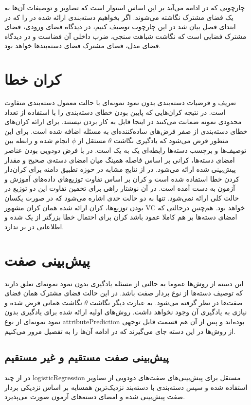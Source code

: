  چارچوبی که در ادامه می‌آید بر این اساس استوار است که تصاویر و توصیفات آن‌ها به یک فضای مشترک نگاشته می‌شوند. اگر بخواهیم دسته‌بندی ارائه شده در \cite{bengio08} را که در ابتدای فصل بیان شد در  این چارچوب توصیف کنیم، در دیدگاه فضای ورودی، فضای مشترک فضایی است که نگاشت شباهت سنجی، ضرب داخلی آن فضاست و در دیدگاه فضای مدل، فضای مشترک فضای دسته‌بندها خواهد بود.


\section{کران خطا}\label{bound}
تعریف و فرضیات دسته‌بندی بدون نمود نمونه‌ای با حالت معمول دسته‌بندی متفاوت است. در نتیجه کران‌هایی که پایین بودن خطای دسته‌بندی را با استفاده از تعداد محدودی نمونه ضمانت می‌کنند در اینجا قابل به کار بردن نیستند. برای ارائه کران‌های خطای دسته‌بندی از صفر فرض‌های ساده‌کننده‌ای به مسئله اضافه شده است. برای این منظور فرض می‌شود که یادگیری نگاشت 
$\theta$
 مستقل از $\phi$ انجام شده و رابطه بین توصیف‌ها و برچسب دسته‌ها رابطه‌ای یک به یک است. 
در \cite{hinton09} با فرض دودویی بودن عناصر امضای دسته‌ها، کرانی  بر اساس فاصله همینگ 
میان امضای دسته‌ی صحیح و مقدار پیش‌بینی شده ارائه می‌شود. در \cite{emb15} از نتایج مشابه در حوزه تطبیق دامنه برای کران‌دار کردن خطا استفاده شده است و کران بر اساس تفاوت توزیع‌های داده‌های آموزش و آزمون به دست آمده است. در آن نوشتار راهی برای تخمین تفاوت این دو توزیع در حالت کلی ارائه نمی‌شود. تنها به دو حالت حدی اشاره می‌شود که در صورت یکسان بودن توزیع‌ها، کران ارائه شده همان کران مشهور VC \cite{vapnik} خواهد بود. هم‌چنین درحالتی که امضای دسته‌ها بر هم کاملا عمود باشد کران برای احتمال خطا بزرگتر از یک شده و اطلاعاتی در بر ندارد. 
\section{پیش‌بینی صفت  }
این دسته از روش‌ها عموما به حالتی از مسئله یادگیری بدون نمود نمونه‌ای تعلق دارند که توصیف دسته‌ها از نوع بردار صفت باشد. در این حالت فضای مشترک همان فضای صفت‌ها در نظر گرفته می‌شود. به عبارت دیگر نگاشت $\theta$ نگاشت همانی فرض شده و نیازی به یادگیری آن وجود نخواهد داشت. روش‌های اولیه ارائه شده برای یادگیری بدون نمود نمونه‌ای از نوع \gls{attributePrediction}
بوده‌اند و پس از آن‌ هم قسمت قابل توجهی از روش‌ها در این دسته جای می‌گیرند که در ادامه آن‌ها را به تفصیل مرور می‌کنیم.

\subsection{پیش‌بینی صفت مستقیم و غیر مستقیم}

در \cite{hinton09} از چند \gls{logisticRegression}  مستقل برای پیش‌بینی‌های صفت‌های دودویی از تصاویر  استفاده شده و سپس دسته‌بندی با دسته‌بند نزدیک‌ترین همسایه بر اساس نزدیکی بردار صفت پیش‌بینی شده و امضای دسته‌های آزمون صورت می‌پذیرد.


